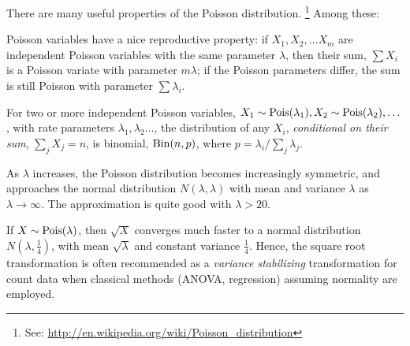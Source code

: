 \documentclass[10pt,krantz2]{krantz}\usepackage[]{graphicx}\usepackage[]{color}
\begin{document}
There are many useful properties of the Poisson distribution.%
\footnote{
See: \url{http://en.wikipedia.org/wiki/Poisson_distribution}
}
Among these:
\begin{itemize*}
  \item Poisson variables have a nice reproductive property:
    if $X_1, X_2, \dots X_m$ are independent Poisson
    variables with the same parameter $\lambda$, then their
    sum, $\sum X_i$ is a Poisson variate with parameter $m \lambda$;
    if the Poisson parameters differ, the sum is still Poisson with
    parameter $\sum \lambda_i$.
  \item For two or more independent Poisson variables,
    $X_1 \sim \Pois(\lambda_1), X_2 \sim \Pois(\lambda_2), \dots$, with rate parameters
    $ \lambda_1, \lambda_2 \dots$, the distribution of
    any $X_i$, \emph{conditional on their sum}, $\sum_j X_j = n$, is
    binomial, $\Bin (n, p)$, where $p = \lambda_i / \sum_j \lambda_j$.
  \item As $\lambda$ increases, the Poisson distribution becomes increasingly
    symmetric, and approaches the normal distribution $N (\lambda, \lambda)$
    with mean and variance $\lambda$ as $\lambda \rightarrow \infty$.
    The approximation is quite good with $\lambda > 20$.
  \item If $X \sim \Pois(\lambda)$, then $\sqrt{X}$ converges much faster to
    a normal distribution $N (\lambda, \frac14)$, with mean $\sqrt\lambda$
    and constant variance $\frac14$.  Hence, the square root transformation is often recommended
    as a \emph{variance stabilizing} transformation for count data
    when classical methods (ANOVA, regression) assuming normality are employed.
  \end{itemize*}
\end{document}
